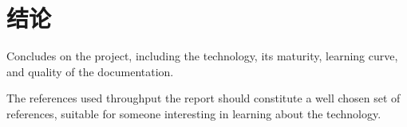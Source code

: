 \section{结论}

Concludes on the project, including the technology, its maturity,
learning curve, and quality of the documentation.

The references used throughput the report should constitute a well
chosen set of references, suitable for someone interesting in learning
about the technology.

